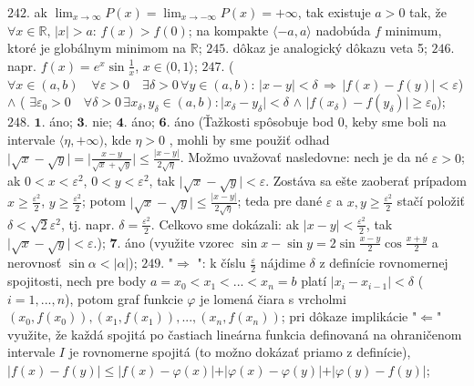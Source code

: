 $\boxed{242.}$ ak  $\lim_{x \to \infty }P(x) = \lim_{x \to -\infty }P(x)= +\infty $, tak existuje $a>0$ tak, že $\forall x \in \mathbb{R}, \, \vert x \vert > a: \, f(x) > f(0) $; na kompakte $\langle -a,a \rangle$ nadobúda $f$ minimum, ktoré je globálnym minimom na $ \mathbb{R} $;
$\boxed{245.}$ dôkaz je analogický dôkazu veta 5;
$\boxed{246.}$ napr. $f(x)=e^{x} \sin \frac{1}{x}$, $ x \in (0,1 \rangle$; 
$\boxed{247.}$ ($\forall x \in (a,b) \quad \forall\varepsilon  >0 \quad   \exists \delta >0 \,  \forall y \in (a,b): \, \vert x-y \vert < \delta \, \Rightarrow \, \vert f(x)-f(y) \vert < \varepsilon$)  $\land$ ( $\exists \varepsilon _{0} >0 \quad \forall \delta  >0 \, \exists x_{\delta}, y_{\delta}  \in (a,b): \vert  x_{\delta}- y_{\delta}\vert <  \delta $  $\land$  $\vert f(x_{\delta})-f(y_{\delta}) \vert \geq \varepsilon_{0} $);
$\boxed{248.}$  $\boldsymbol{1.}$ áno;
$\boldsymbol{3.}$  nie;
$\boldsymbol{4.}$ áno;
$\boldsymbol{6.}$ áno (Ťažkosti spôsobuje bod $0$, keby sme boli na intervale $\langle \eta , +\infty)$, kde $\eta >0$ , mohli by sme použiť odhad $ \vert \sqrt{x} - \sqrt{y} \vert =\vert \frac{x-y}{\sqrt{x} + \sqrt{y}}\vert \leq \frac{\vert x-y \vert}{2 \sqrt{\eta}} $. Možmo uvažovať nasledovne: nech je da né $\varepsilon  >0 $; ak $0 <  x <  \varepsilon ^{2} $, $0 <  y <  \varepsilon ^{2} $, tak  $ \vert \sqrt{x} - \sqrt{y} \vert < \varepsilon$. Zostáva sa ešte zaoberať prípadom $x\geq \frac{\varepsilon^{2}}{2} $, $y\geq \frac{\varepsilon^{2}}{2} $; potom $ \vert \sqrt{x} - \sqrt{y} \vert \leq \frac{\vert x-y \vert}{2 \sqrt{\eta}}$; teda pre dané $\varepsilon$ a $x,y \geq \frac{\varepsilon^{2}}{2}$ stačí položiť $\delta <  \sqrt{2}\varepsilon^{2} $, tj. napr. $\delta =\frac{\varepsilon^{2}}{2}$. Celkovo sme dokázali: ak  $ \vert x-y  \vert < \frac{\varepsilon^{2}}{2}$, tak $ \vert \sqrt{x} - \sqrt{y} \vert < \varepsilon$.);
 $\boldsymbol{7.}$ áno  (využite vzorec $ \sin x - \sin y = 2 \sin \frac{x-y}{2} \cos \frac{x+y}{2}$  a nerovnosť $\sin \alpha < \vert \alpha\vert$);
$\boxed{249.}$ "$\Rightarrow$ ": k číslu $\frac{\varepsilon}{2}$	nájdime $\delta$ z definície rovnomernej spojitosti, nech pre  body $a=x_{0 }< x_{1}<...< x_{n}=b$ platí $\vert x_{i} -x_{i-1}\vert < \delta$ ($i=1,...,n $), potom graf funkcie $\varphi $ je lomená čiara s vrcholmi  $(x_{0 }, f(x_{0})),(x_{1 }, f(x_{1})), ..., (x_{n }, f(x_{n}))$; pri dôkaze implikácie "$\Leftarrow$" využite, že každá spojitá po častiach lineárna funkcia definovaná na ohraničenom intervale $I$ je rovnomerne spojitá (to možno dokázať priamo z definície), $\vert f(x)-f(y) \vert \leq  \vert f(x)-\varphi(x) \vert + \vert \varphi(x)-\varphi(y) \vert + \vert \varphi(y)-f(y) \vert$;
